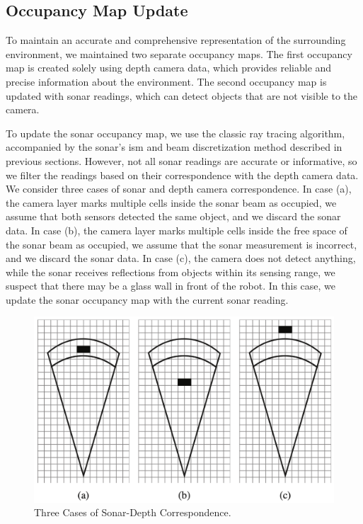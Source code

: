 \subsection{Occupancy Map Update}
\label{sec:method_occ}
To maintain an accurate and comprehensive representation of the surrounding environment, we maintained two separate occupancy maps. The first occupancy map is created solely using depth camera data, which provides reliable and precise information about the environment. The second occupancy map is updated with sonar readings, which can detect objects that are not visible to the camera.

To update the sonar occupancy map, we use the classic ray tracing algorithm, accompanied by the sonar's \gls{ism} and beam discretization method described in previous sections. However, not all sonar readings are accurate or informative, so we filter the readings based on their correspondence with the depth camera data. We consider three cases of sonar and depth camera correspondence. In case (a), the camera layer marks multiple cells inside the sonar beam as occupied, we assume that both sensors detected the same object, and we discard the sonar data. In case (b), the camera layer marks multiple cells inside the free space of the sonar beam as occupied, we assume that the sonar measurement is incorrect, and we discard the sonar data. In case (c), the camera does not detect anything, while the sonar receives reflections from objects within its sensing range, we suspect that there may be a glass wall in front of the robot. In this case, we update the sonar occupancy map with the current sonar reading.

\begin{figure}[h]
    \centering
    \includegraphics[width=0.8\columnwidth]{fig/occ.png}
    \caption{Three Cases of Sonar-Depth Correspondence.}
    \label{fig:occ}
\end{figure}

